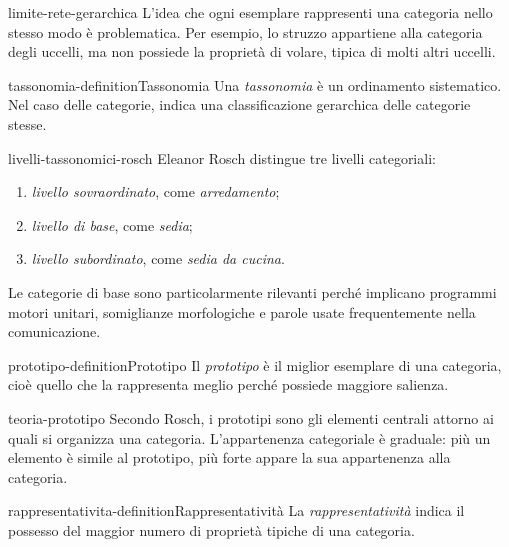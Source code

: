 \documentclass[preview]{standalone}
\begin{document}
\begin{snippet}{limite-rete-gerarchica}
    L'idea che ogni esemplare rappresenti una categoria nello stesso modo è
    problematica. Per esempio, lo struzzo appartiene alla categoria degli
    uccelli, ma non possiede la proprietà di volare, tipica di molti altri
    uccelli.
\end{snippet}

\begin{snippetdefinition}{tassonomia-definition}{Tassonomia}
    Una \emph{tassonomia} è un ordinamento sistematico. Nel caso delle
    categorie, indica una classificazione gerarchica delle categorie stesse.
\end{snippetdefinition}

\begin{snippet}{livelli-tassonomici-rosch}
    Eleanor Rosch distingue tre livelli categoriali:
    \begin{enumerate}
        \item \emph{livello sovraordinato}, come \emph{arredamento};
        \item \emph{livello di base}, come \emph{sedia};
        \item \emph{livello subordinato}, come \emph{sedia da cucina}.
    \end{enumerate}
    Le categorie di base sono particolarmente rilevanti perché implicano
    programmi motori unitari, somiglianze morfologiche e parole usate
    frequentemente nella comunicazione.
\end{snippet}


\begin{snippetdefinition}{prototipo-definition}{Prototipo}
    Il \emph{prototipo} è il miglior esemplare di una categoria, cioè quello che
    la rappresenta meglio perché possiede maggiore salienza.
\end{snippetdefinition}

\begin{snippet}{teoria-prototipo}
    Secondo Rosch, i prototipi sono gli elementi centrali attorno ai quali si
    organizza una categoria. L'appartenenza categoriale è graduale: più un
    elemento è simile al prototipo, più forte appare la sua appartenenza alla
    categoria.
\end{snippet}

\begin{snippetdefinition}{rappresentativita-definition}{Rappresentatività}
    La \emph{rappresentatività} indica il possesso del maggior numero di
    proprietà tipiche di una categoria.
\end{snippetdefinition}
\end{document}
